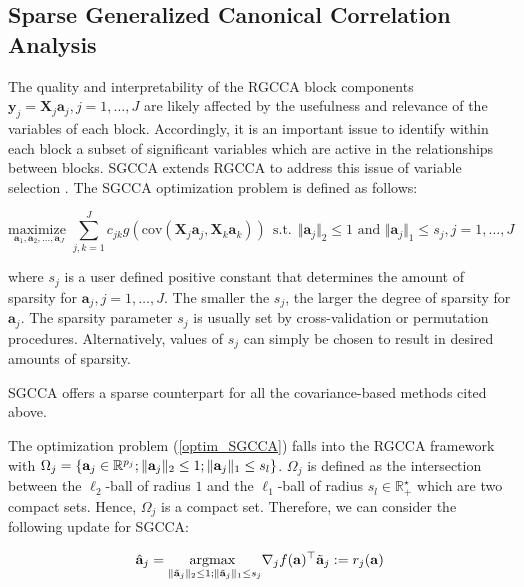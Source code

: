 \documentclass[
]{jss}
\begin{document}
\hypertarget{sparse-generalized-canonical-correlation-analysis}{%
\subsection{Sparse Generalized Canonical Correlation
Analysis}\label{sparse-generalized-canonical-correlation-analysis}}

The quality and interpretability of the RGCCA block components
\(\mathbf{y}_j= \mathbf{X}_j \mathbf{a}_j,j=1, \ldots,J\) are likely
affected by the usefulness and relevance of the variables of each block.
Accordingly, it is an important issue to identify within each block a
subset of significant variables which are active in the relationships
between blocks. SGCCA extends RGCCA to address this issue of variable
selection \citep{Tenenhaus2014b}. The SGCCA optimization problem is
defined as follows:

\begin{equation}
\displaystyle \underset{\mathbf{a}_1,\mathbf{a}_2, \ldots,\mathbf{a}_J}{\text{maximize~}} \sum_{j, k = 1}^J c_{jk}g(\mathrm{cov}(\mathbf{X}_j\mathbf{a}_j, \mathbf{X}_k\mathbf{a}_k)) \mathrm{~~s.t.~~} \Vert \mathbf{a}_j \Vert_2 \le 1 \text{~and~} \Vert \mathbf{a}_j \Vert_1 \le s_j, j=1,\ldots,J
\label{optim_SGCCA}
\end{equation}

where \(s_j\) is a user defined positive constant that determines the
amount of sparsity for \(\mathbf{a}_j, j=1, \ldots,J\). The smaller the
\(s_j\), the larger the degree of sparsity for \(\mathbf{a}_j\). The
sparsity parameter \(s_j\) is usually set by cross-validation or
permutation procedures. Alternatively, values of \(s_j\) can simply be
chosen to result in desired amounts of sparsity.

SGCCA offers a sparse counterpart for all the covariance-based methods
cited above.

The optimization problem (\ref{optim_SGCCA}) falls into the RGCCA
framework with
\(\Omega_j = \lbrace \mathbf{a}_j\in\mathbb{R}^{p_j}; \Vert \mathbf{a}_j \Vert_2 \leq 1; \Vert \mathbf{a}_j \Vert_1 \leq s_l\rbrace\).
\(\Omega_j\) is defined as the intersection between the \(\ell_2\)-ball
of radius \(1\) and the \(\ell_1\)-ball of radius
\(s_l \in \mathbb{R}_+^\star\) which are two compact sets. Hence,
\(\Omega_j\) is a compact set. Therefore, we can consider the following
update for SGCCA:

\begin{equation}
    \hat{\mathbf{a}}_j = \underset{\Vert \tilde{\mathbf{a}}_j \Vert_2 \leq 1 ; \Vert \tilde{\mathbf{a}}_j \Vert_1 \leq s_j}{\mathrm{argmax~}} \nabla_j f(\mathbf{a})^\top \tilde{\mathbf{a}}_j := r_j(\mathbf{a}) 
\label{update_SGCCA}
\end{equation}
\end{document}
